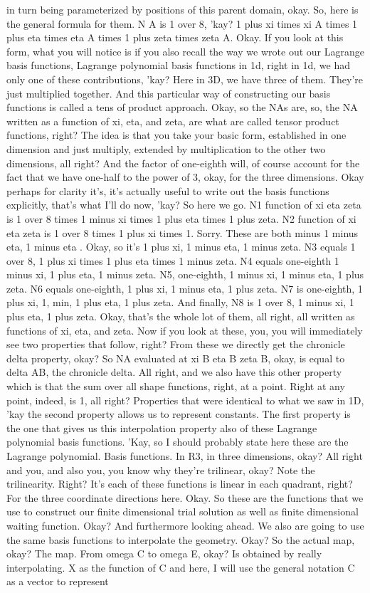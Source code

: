\documentclass[10pt]{article}
\begin{document}
in turn being parameterized by positions of this parent domain, okay. So, here is the general formula for them. N A is 1 over 8, 'kay? 1 plus xi times xi A times 1 plus eta times eta A times 1 plus zeta times zeta A. Okay. If you look at this form, what you will notice is if you also recall the way we wrote out our Lagrange basis functions, Lagrange polynomial basis functions in 1d, right in 1d, we had only one of these contributions, 'kay? Here in 3D, we have three of them. They're just multiplied together. And this particular way of constructing our basis functions is called a tens of product approach. Okay, so the NAs are, so, the NA written as a function of xi, eta, and zeta, are what are called tensor product functions, right? The idea is that you take your basic form, established in one dimension and just multiply, extended by multiplication to the other two dimensions, all right? And the factor of one-eighth will, of course account for the fact that we have one-half to the power of 3, okay, for the three dimensions. Okay perhaps for clarity it's, it's actually useful to write out the basis functions explicitly, that's what I'll do now, 'kay? So here we go. N1 function of xi eta zeta is 1 over 8 times 1 minus xi times 1 plus eta times 1 plus zeta. N2 function of xi eta zeta is 1 over 8 times 1 plus xi times 1. Sorry. These are both minus 1 minus eta, 1 minus eta . Okay, so it's 1 plus xi, 1 minus eta, 1 minus zeta. N3 equals 1 over 8, 1 plus xi times 1 plus eta times 1 minus zeta. N4 equals one-eighth 1 minus xi, 1 plus eta, 1 minus zeta. N5, one-eighth, 1 minus xi, 1 minus eta, 1 plus zeta. N6 equals one-eighth, 1 plus xi, 1 minus eta, 1 plus zeta. N7 is one-eighth, 1 plus xi, 1, min, 1 plus eta, 1 plus zeta. And finally, N8 is 1 over 8, 1 minus xi, 1 plus eta, 1 plus zeta. Okay, that's the whole lot of them, all right, all written as functions of xi, eta, and zeta. Now if you look at these, you, you will immediately see two properties that follow, right? From these we directly get the chronicle delta property, okay? So NA evaluated at xi B eta B zeta B, okay, is equal to delta AB, the chronicle delta. All right, and we also have this other property which is that the sum over all shape functions, right, at a point. Right at any point, indeed, is 1, all right? Properties that were identical to what we saw in 1D, 'kay the second property allows us to represent constants. The first property is the one that gives us this interpolation property also of these Lagrange polynomial basis functions. 'Kay, so I should probably state here these are the Lagrange polynomial. Basis functions. In R3, in three dimensions, okay? All right and you, and also you, you know why they're trilinear, okay? Note the trilinearity. Right? It's each of these functions is linear in each quadrant, right? For the three coordinate directions here. Okay. So these are the functions that we use to construct our finite dimensional trial solution as well as finite dimensional waiting function. Okay? And furthermore looking ahead. We also are going to use the same basis functions to interpolate the geometry. Okay? So the actual map, okay? The map. From omega C to omega E, okay? Is obtained by really interpolating. X as the function of C and here, I will use the general notation C as a vector to represent 
\end{document}
